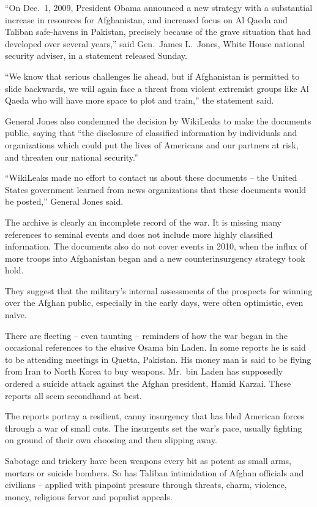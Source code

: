 ﻿\documentclass[12pt]{article}
\begin{document}
``On Dec.~1, 2009, President Obama announced a new strategy with a substantial increase in resources
for Afghanistan, and increased focus on Al Qaeda and Taliban safe-havens in Pakistan, precisely
because of the grave situation that had developed over several years,'' said Gen.~James L.~Jones,
White House national security adviser, in a statement released Sunday.

``We know that serious challenges lie ahead, but if Afghanistan is permitted to slide backwards, we
will again face a threat from violent extremist groups like Al Qaeda who will have more space to
plot and train,'' the statement said.

General Jones also condemned the decision by WikiLeaks to make the documents public, saying that
``the disclosure of classified information by individuals and organizations which could put the
lives of Americans and our partners at risk, and threaten our national security.''

``WikiLeaks made no effort to contact us about these documents – the United States government
learned from news organizations that these documents would be posted,'' General Jones said.

The archive is clearly an incomplete record of the war. It is missing many references to seminal
events and does not include more highly classified information. The documents also do not cover
events in 2010, when the influx of more troops into Afghanistan began and a new counterinsurgency
strategy took hold.

They suggest that the military's internal assessments of the prospects for winning over the Afghan
public, especially in the early days, were often optimistic, even na\"ive.

There are fleeting -- even taunting -- reminders of how the war began in the occasional references
to the elusive Osama bin Laden. In some reports he is said to be attending meetings in Quetta,
Pakistan. His money man is said to be flying from Iran to North Korea to buy weapons. Mr.~bin Laden
has supposedly ordered a suicide attack against the Afghan president, Hamid Karzai. These reports
all seem secondhand at best.

The reports portray a resilient, canny insurgency that has bled American forces through a war of
small cuts. The insurgents set the war's pace, usually fighting on ground of their own choosing and
then slipping away.

Sabotage and trickery have been weapons every bit as potent as small arms, mortars or suicide
bombers. So has Taliban intimidation of Afghan officials and civilians -- applied with pinpoint
pressure through threats, charm, violence, money, religious fervor and populist appeals.
\end{document}
